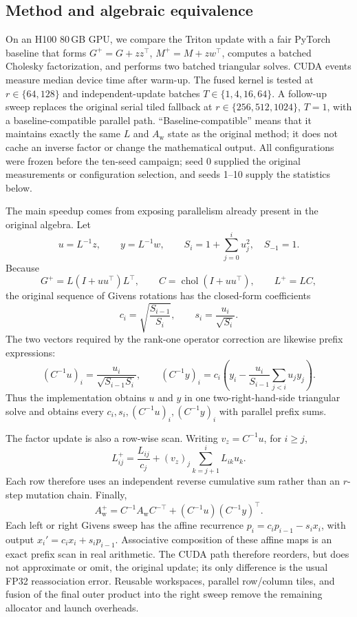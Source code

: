\documentclass[11pt]{article}
\newcommand{\Aw}{A_{\mathrm w}}
\begin{document}
\subsection{Method and algebraic equivalence}

On an H100 80\,GB GPU, we compare the Triton update with a fair PyTorch
baseline that forms \(G^+=G+zz^\top\), \(M^+=M+zw^\top\), computes a batched
Cholesky factorization, and performs two batched triangular solves.  CUDA
events measure median device time after warm-up.  The fused kernel is tested
at \(r\in\{64,128\}\) and independent-update batches
\(T\in\{1,4,16,64\}\).  A follow-up sweep replaces the original serial tiled
fallback at \(r\in\{256,512,1024\}\), \(T=1\), with a
baseline-compatible parallel path.  ``Baseline-compatible'' means that it
maintains exactly the same \(L\) and \(\Aw\) state as the original method; it
does not cache an inverse factor or change the mathematical output.  All
configurations were frozen before the ten-seed campaign; seed 0 supplied the
original measurements or configuration selection, and seeds 1--10 supply the
statistics below.

The main speedup comes from exposing parallelism already present in the
original algebra.  Let
\[
 u=L^{-1}z,\qquad y=L^{-1}w,\qquad
 S_i=1+\sum_{j=0}^{i}u_j^2,\quad S_{-1}=1.
\]
Because
\[
 G^+=L(I+uu^\top)L^\top,\qquad
 C=\operatorname{chol}(I+uu^\top),\qquad L^+=LC,
\]
the original sequence of Givens rotations has the closed-form coefficients
\[
 c_i=\sqrt{\frac{S_{i-1}}{S_i}},\qquad
 s_i=\frac{u_i}{\sqrt{S_i}}.
\]
The two vectors required by the rank-one operator correction are likewise
prefix expressions:
\[
 (C^{-1}u)_i=\frac{u_i}{\sqrt{S_{i-1}S_i}},\qquad
 (C^{-1}y)_i
 =c_i\left(y_i-\frac{u_i}{S_{i-1}}\sum_{j<i}u_jy_j\right).
\]
Thus the implementation obtains \(u\) and \(y\) in one two-right-hand-side
triangular solve and obtains every \(c_i,s_i,(C^{-1}u)_i,(C^{-1}y)_i\)
with parallel prefix sums.

The factor update is also a row-wise scan.  Writing
\(v_z=C^{-1}u\), for \(i\ge j\),
\[
 L^+_{ij}
 =\frac{L_{ij}}{c_j}
 +(v_z)_j\sum_{k=j+1}^{i}L_{ik}u_k.
\]
Each row therefore uses an independent reverse cumulative sum rather than an
\(r\)-step mutation chain.  Finally,
\[
 \Aw^+=C^{-1}\Aw C^{-\top}
       +(C^{-1}u)(C^{-1}y)^\top .
\]
Each left or right Givens sweep has the affine recurrence
\(p_i=c_i p_{i-1}-s_i x_i\), with output
\(x_i'=c_i x_i+s_i p_{i-1}\).  Associative composition of these affine maps
is an exact prefix scan in real arithmetic.  The CUDA path therefore
reorders, but does not approximate or omit, the original update; its only
difference is the usual FP32 reassociation error.  Reusable workspaces,
parallel row/column tiles, and fusion of the final outer product into the
right sweep remove the remaining allocator and launch overheads.
\end{document}
